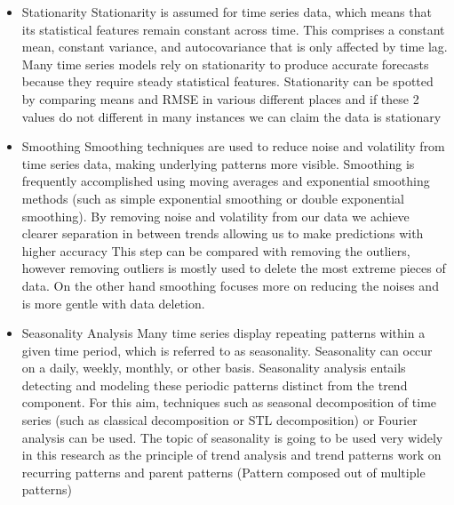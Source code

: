 \documentclass{imc-inf}
\begin{document}
	\begin{itemize}
		\item Stationarity
		Stationarity is assumed for time series data, which means that its statistical features remain constant across time.
		This comprises a constant mean, constant variance, and autocovariance that is only affected by time lag.
		Many time series models rely on stationarity to produce accurate forecasts because they require steady statistical features.
		Stationarity can be spotted by comparing means and RMSE in various different places and if these 2 values do not different in many
		instances we can claim the data is stationary
		\item Smoothing
		Smoothing techniques are used to reduce noise and volatility from time series data, making underlying patterns more visible. 
		Smoothing is frequently accomplished using moving averages and exponential smoothing methods
		(such as simple exponential smoothing or double exponential smoothing). By removing noise and volatility from our data we achieve
		clearer separation in between trends allowing us to make predictions with higher accuracy This step can be compared with removing the outliers,
		however removing outliers is mostly used to delete the most extreme pieces of data. On the other hand smoothing focuses more on reducing the noises
		and is more gentle with data deletion.
		\item Seasonality Analysis
		Many time series display repeating patterns within a given time period, which is referred to as seasonality. Seasonality can occur on a daily, weekly, monthly, or other basis.
		Seasonality analysis entails detecting and modeling these periodic patterns distinct from the trend component.
		For this aim, techniques such as seasonal decomposition of time series (such as classical decomposition or STL decomposition) or Fourier analysis can be used.
		The topic of seasonality is going to be used very widely in this research as the principle of trend analysis and trend patterns work on recurring patterns and parent patterns
		(Pattern composed out of multiple patterns)

	\end{itemize}
\end{document}
